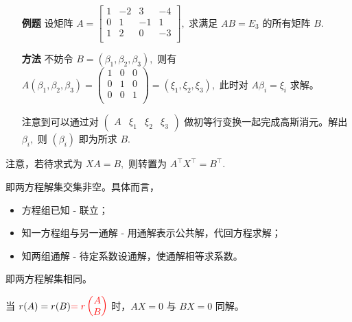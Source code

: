 \begin{itemize}
    \item[\textbf{例题}] 设矩阵 $ A = \begin{bmatrix}
        1&-2&3&-4\\
        0&1&-1&1\\
        1&2&0&-3\\
    \end{bmatrix}, $ 求满足 $ AB = E_3 $ 的所有矩阵 $ B. $ 
    \item[\textbf{方法}] 不妨令 $ B = (\beta_1,\beta_2,\beta_3), $ 
    则有 $ A(\beta_1,\beta_2,\beta_3) = \begin{pmatrix}
        1&0&0\\0&1&0\\0&0&1\\
    \end{pmatrix} = (\xi_1,\xi_2,\xi_3), $ 此时对 $ A\beta_i = \xi_i $ 求解。

    注意到可以通过对 $ \begin{pmatrix}
        A & \xi_1 & \xi_2 & \xi_3
    \end{pmatrix} $ 做初等行变换一起完成高斯消元。解出 $ \beta_i, $
    则 $ (\beta_i) $ 即为所求 $ B. $ 
\end{itemize}

注意，若待求式为 $ XA = B, $ 则转置为 $ A^\top X^\top = B^\top. $ 



即两方程解集交集非空。具体而言，
\begin{itemize}
    \item 方程组已知 - 联立；
    \item 知一方程组与另一通解 - 用通解表示公共解，代回方程求解；
    \item 知两组通解 - 待定系数设通解，使通解相等求系数。
\end{itemize}


即两方程解集相同。

当 $ r(A) = r(B)\textcolor{red}{=r\begin{pmatrix}
    A \\ B
\end{pmatrix}} $ 时，$ AX = 0 $ 与 $ BX = 0 $ 同解。

